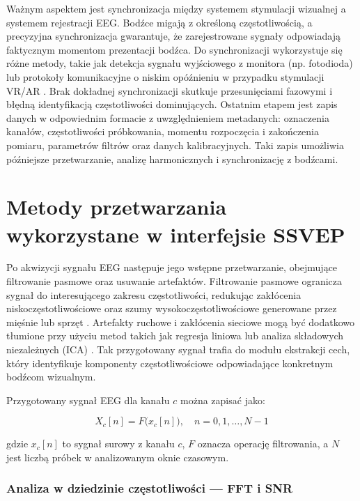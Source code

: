 Ważnym aspektem jest synchronizacja między systemem stymulacji wizualnej a systemem rejestracji EEG. Bodźce migają z określoną częstotliwością, a precyzyjna synchronizacja gwarantuje, że zarejestrowane sygnały odpowiadają faktycznym momentom prezentacji bodźca. Do synchronizacji wykorzystuje się różne metody, takie jak detekcja sygnału wyjściowego z monitora (np. fotodioda) lub protokoły komunikacyjne o niskim opóźnieniu w przypadku stymulacji VR/AR \cite{nakanishi2018}. Brak dokładnej synchronizacji skutkuje przesunięciami fazowymi i błędną identyfikacją częstotliwości dominujących. Ostatnim etapem jest zapis danych w odpowiednim formacie z uwzględnieniem metadanych: oznaczenia kanałów, częstotliwości próbkowania, momentu rozpoczęcia i zakończenia pomiaru, parametrów filtrów oraz danych kalibracyjnych. Taki zapis umożliwia późniejsze przetwarzanie, analizę harmonicznych i synchronizację z bodźcami.

\section{Metody przetwarzania wykorzystane w interfejsie SSVEP}
\label{sec:metody_przetwarzania}

Po akwizycji sygnału EEG następuje jego wstępne przetwarzanie, obejmujące
filtrowanie pasmowe oraz usuwanie artefaktów. Filtrowanie pasmowe ogranicza
sygnał do interesującego zakresu częstotliwości, redukując zakłócenia
niskoczęstotliwościowe oraz szumy wysokoczęstotliwościowe generowane przez
mięśnie lub sprzęt \cite{vialatte2010, wang2020}. Artefakty ruchowe
i zakłócenia sieciowe mogą być dodatkowo tłumione przy użyciu metod takich
jak regresja liniowa lub analiza składowych niezależnych (ICA)
\cite{makeig1996}. Tak przygotowany sygnał trafia do modułu ekstrakcji cech,
który identyfikuje komponenty częstotliwościowe odpowiadające konkretnym
bodźcom wizualnym.

Przygotowany sygnał EEG dla kanału $c$ można zapisać jako:

\[
    X_c[n] = F\big(x_c[n]\big), \quad n = 0,1,\dots,N-1
\]

\noindent gdzie $x_c[n]$ to sygnał surowy z kanału $c$, $F$ oznacza operację
filtrowania, a $N$ jest liczbą próbek w analizowanym oknie czasowym.

\subsubsection{Analiza w dziedzinie częstotliwości --- FFT i SNR}

